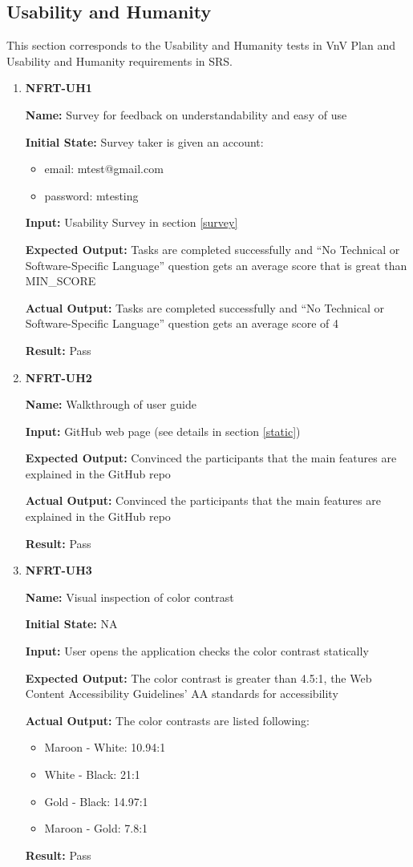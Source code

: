 \documentclass[12pt, titlepage]{article}
\begin{document}
\subsection{Usability and Humanity}
This section corresponds to the Usability and Humanity tests in VnV Plan and Usability and Humanity requirements in SRS.
\begin{enumerate}
\item \textbf{NFRT-UH1}

\textbf{Name:} Survey for feedback on understandability and easy of use

\textbf{Initial State:} Survey taker is given an account:
\begin{itemize}
\item email: mtest@gmail.com
\item password: mtesting
\end{itemize}

\textbf{Input:} Usability Survey in section \ref{survey}

\textbf{Expected Output:} Tasks are completed successfully and ``No Technical or Software-Specific Language'' question gets an average score that is great than MIN\_SCORE

\textbf{Actual Output:} Tasks are completed successfully and ``No Technical or Software-Specific Language'' question gets an average score of 4

\textbf{Result:} Pass

\item \textbf{NFRT-UH2}

\textbf{Name:} Walkthrough of user guide

\textbf{Input:} GitHub web page (see details in section \ref{static})
					
\textbf{Expected Output:} Convinced the participants that the main features are explained in the GitHub repo

\textbf{Actual Output:} Convinced the participants that the main features are explained in the GitHub repo

\textbf{Result:} Pass

\item \textbf{NFRT-UH3}

\textbf{Name:} Visual inspection of color contrast

\textbf{Initial State:} NA
					
\textbf{Input:} User opens the application checks the color contrast statically

\textbf{Expected Output:} The color contrast is greater than 4.5:1,  the Web Content Accessibility Guidelines' AA standards for accessibility

\textbf{Actual Output:} The color contrasts are listed following:
\begin{itemize}
\item Maroon - White: 10.94:1
\item White - Black: 21:1
\item Gold - Black: 14.97:1
\item Maroon - Gold: 7.8:1
\end{itemize}

\textbf{Result:} Pass
\end{enumerate}
\end{document}
